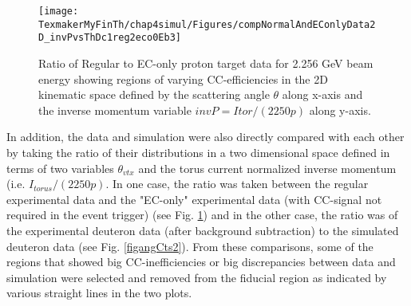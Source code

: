 \begin{comment}
\begin{figure}[h] %
\centering
\leavevmode \texttt{[image: TexmakerMyFinTh/chap4simul/FigCuts/invPvThVtx\_ThvPhDcFidCt\_Exp2SimEb2N]} 
\caption[Angular Cuts shown in Exp(\nd3)/Sim(D).]{Ratio of \nd3 experimental data to simulated deuteron data (for 2.0 GeV beam energy) as a function of I$_{torus}$/2250p vs \th at the vertex. The red and magenta lines indicate additional excluded regions. %
}
\label{figangCts1}
\end{figure}
\end{comment}



\begin{figure}[h] %
\centering
\leavevmode \texttt{[image: TexmakerMyFinTh/chap4simul/Figures/compNormalAndEConlyData2D\_invPvsThDc1reg2eco0Eb3]} 
\caption[Regular/EC-only plots]{Ratio of Regular to EC-only proton target data for 2.256 GeV beam energy showing regions of varying CC-efficiencies in the 2D kinematic space defined by the scattering angle $\theta$ along x-axis and the inverse momentum variable $invP=Itor/(2250p)$ along y-axis.}
\label{figRegByEConly}
\end{figure}



In addition, the data and simulation were also directly compared with each other by taking the ratio of their distributions in a two dimensional space defined in terms of two variables $\theta_{vtx}$ and the torus current normalized inverse momentum (i.e. $ I_{torus}/(2250 p)$. In one case, the ratio was taken between %
the regular experimental data and the "EC-only" experimental data (with CC-signal not required in the event trigger) (see Fig. \ref{figRegByEConly}) %
 and in the other case, the ratio was of the experimental deuteron data (after background subtraction) to the simulated deuteron data (see Fig. \ref{figangCts2}). From these comparisons, some of the regions that showed big CC-inefficiencies or big discrepancies between data and simulation were selected and removed from the fiducial region %
as indicated by various straight lines in the two plots.

